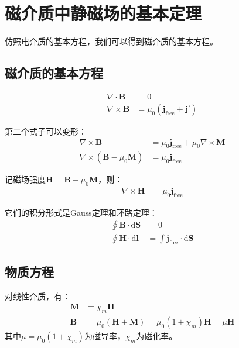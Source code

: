 \documentclass[12pt,onecolumn,a4paper]{book}
\numberwithin{table}{subsection}
\numberwithin{equation}{subsection}
\begin{document}
    \section{磁介质中静磁场的基本定理}

    仿照电介质的基本方程，我们可以得到磁介质的基本方程。

    \subsection{磁介质的基本方程}

    \begin{align}
        \nabla \cdot \mathbf{B}  & = 0                                            \\
        \nabla \times \mathbf{B} & = \mu_0 (\mathbf{j}_\text{free} + \mathbf{j'})
    \end{align}

    第二个式子可以变形：
    \begin{align}
        \nabla \times \mathbf{B}                      & = \mu_0 \mathbf{j}_\text{free} + \mu_0 \nabla \times \mathbf{M} \\
        \nabla \times (\mathbf{B} - \mu_0 \mathbf{M}) & = \mu_0 \mathbf{j}_\text{free}
    \end{align}

    记磁场强度$\mathbf{H} = \mathbf{B} - \mu_0 \mathbf{M}$，则：
    \begin{align}
        \nabla \times \mathbf{H} & = \mu_0 \mathbf{j}_\text{free}
    \end{align}

    它们的积分形式是Gauss定理和环路定理：
    \begin{align}
        \oint \mathbf{B} \cdot \mathrm{d} \mathbf{S} & = 0                                                       \\
        \oint \mathbf{H} \cdot \mathrm{d} \mathbf{l} & = \int \mathbf{j}_\text{free} \cdot \mathrm{d} \mathbf{S}
    \end{align}

    \subsection{物质方程}

    对线性介质，有：
    \begin{align}
        \mathbf{M} & = \chi_m \mathbf{H}                                                              \\
        \mathbf{B} & = \mu_0 (\mathbf{H} + \mathbf{M}) = \mu_0 (1+\chi_m) \mathbf{H} = \mu \mathbf{H}
    \end{align}
    其中$\mu = \mu_0 (1+\chi_m)$为磁导率，$\chi_m$为磁化率。
\end{document}
